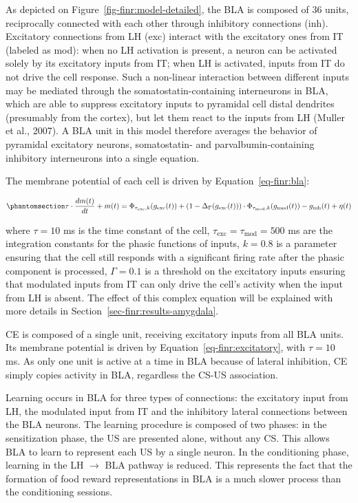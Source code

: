 \documentclass[
  11pt,
  a4paper,
]{scrbook}
\begin{document}
As depicted on Figure~\ref{fig-finr:model-detailed}, the BLA is composed
of 36 units, reciprocally connected with each other through inhibitory
connections (inh). Excitatory connections from LH (exc) interact with
the excitatory ones from IT (labeled as mod): when no LH activation is
present, a neuron can be activated solely by its excitatory inputs from
IT; when LH is activated, inputs from IT do not drive the cell response.
Such a non-linear interaction between different inputs may be mediated
through the somatostatin-containing interneurons in BLA, which are able
to suppress excitatory inputs to pyramidal cell distal dendrites
(presumably from the cortex), but let them react to the inputs from LH
(Muller et al., 2007). A BLA unit in this model therefore averages the
behavior of pyramidal excitatory neurons, somatostatin- and
parvalbumin-containing inhibitory interneurons into a single equation.

The membrane potential of each cell is driven by
Equation~\ref{eq-finr:bla}:

\begin{equation}\phantomsection\label{eq-finr:bla}{
    \tau \cdot \frac{dm(t)}{dt} +  m(t) = \Phi_{ \tau_{\text{exc}}, k } ( g_{\text{exc}}(t) ) + ( 1 - \Delta_{\Gamma}(g_{\text{exc}}(t)) ) \cdot \Phi_{\tau_{\text{mod}}, k} ( g_{\text{mod}}(t) ) - g_{\text{inh}}(t) + \eta(t)
}\end{equation}

where \(\tau = 10\) ms is the time constant of the cell,
\(\tau_{\text{exc}} = \tau_{\text{mod}} = 500\) ms are the integration
constants for the phasic functions of inputs, \(k=0.8\) is a parameter
ensuring that the cell still responds with a significant firing rate
after the phasic component is processed, \(\Gamma = 0.1\) is a threshold
on the excitatory inputs ensuring that modulated inputs from IT can only
drive the cell's activity when the input from LH is absent. The effect
of this complex equation will be explained with more details in
Section~\ref{sec-finr:results-amygdala}.

CE is composed of a single unit, receiving excitatory inputs from all
BLA units. Its membrane potential is driven by
Equation~\ref{eq-finr:excitatory}, with \(\tau = 10\) ms. As only one
unit is active at a time in BLA because of lateral inhibition, CE simply
copies activity in BLA, regardless the CS-US association.

Learning occurs in BLA for three types of connections: the excitatory
input from LH, the modulated input from IT and the inhibitory lateral
connections between the BLA neurons. The learning procedure is composed
of two phases: in the sensitization phase, the US are presented alone,
without any CS. This allows BLA to learn to represent each US by a
single neuron. In the conditioning phase, learning in the LH
\(\rightarrow\) BLA pathway is reduced. This represents the fact that
the formation of food reward representations in BLA is a much slower
process than the conditioning sessions.
\end{document}

